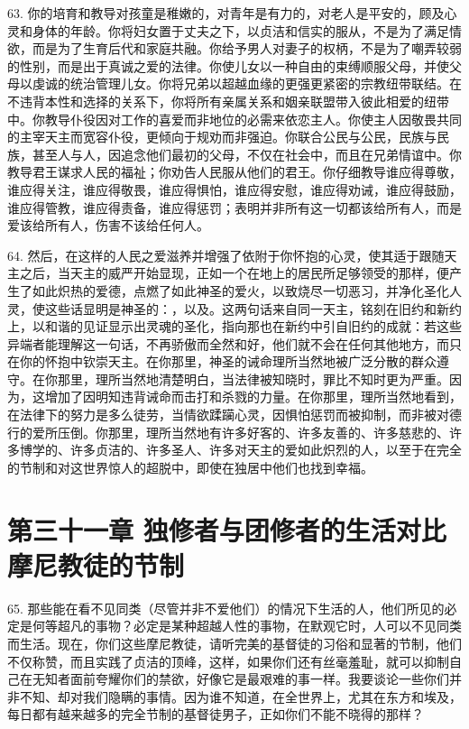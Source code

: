 63. 你的培育和教导对孩童是稚嫩的，对青年是有力的，对老人是平安的，顾及心灵和身体的年龄。你将妇女置于丈夫之下，以贞洁和信实的服从，不是为了满足情欲，而是为了生育后代和家庭共融。你给予男人对妻子的权柄，不是为了嘲弄较弱的性别，而是出于真诚之爱的法律。你使儿女以一种自由的束缚顺服父母，并使父母以虔诚的统治管理儿女。你将兄弟以超越血缘的更强更紧密的宗教纽带联结。在不违背本性和选择的关系下，你将所有亲属关系和姻亲联盟带入彼此相爱的纽带中。你教导仆役因对工作的喜爱而非地位的必需来依恋主人。你使主人因敬畏共同的主宰天主而宽容仆役，更倾向于规劝而非强迫。你联合公民与公民，民族与民族，甚至人与人，因追念他们最初的父母，不仅在社会中，而且在兄弟情谊中。你教导君王谋求人民的福祉；你劝告人民服从他们的君王。你仔细教导谁应得尊敬，谁应得关注，谁应得敬畏，谁应得惧怕，谁应得安慰，谁应得劝诫，谁应得鼓励，谁应得管教，谁应得责备，谁应得惩罚；表明并非所有这一切都该给所有人，而是爱该给所有人，伤害不该给任何人。\par

64. 然后，在这样的人民之爱滋养并增强了依附于你怀抱的心灵，使其适于跟随天主之后，当天主的威严开始显现，正如一个在地上的居民所足够领受的那样，便产生了如此炽热的爱德，点燃了如此神圣的爱火，以致烧尽一切恶习，并净化圣化人灵，使这些话显明是神圣的：，以及。这两句话来自同一天主，铭刻在旧约和新约上，以和谐的见证显示出灵魂的圣化，指向那也在新约中引自旧约的成就：若这些异端者能理解这一句话，不再骄傲而全然和好，他们就不会在任何其他地方，而只在你的怀抱中钦崇天主。在你那里，神圣的诫命理所当然地被广泛分散的群众遵守。在你那里，理所当然地清楚明白，当法律被知晓时，罪比不知时更为严重。因为，这增加了因明知违背诫命而击打和杀戮的力量。在你那里，理所当然地看到，在法律下的努力是多么徒劳，当情欲蹂躏心灵，因惧怕惩罚而被抑制，而非被对德行的爱所压倒。你那里，理所当然地有许多好客的、许多友善的、许多慈悲的、许多博学的、许多贞洁的、许多圣人、许多对天主的爱如此炽烈的人，以至于在完全的节制和对这世界惊人的超脱中，即使在独居中他们也找到幸福。\par


\section{第三十一章 独修者与团修者的生活对比摩尼教徒的节制}

65. 那些能在看不见同类（尽管并非不爱他们）的情况下生活的人，他们所见的必定是何等超凡的事物？必定是某种超越人性的事物，在默观它时，人可以不见同类而生活。现在，你们这些摩尼教徒，请听完美的基督徒的习俗和显著的节制，他们不仅称赞，而且实践了贞洁的顶峰，这样，如果你们还有丝毫羞耻，就可以抑制自己在无知者面前夸耀你们的禁欲，好像它是最艰难的事一样。我要谈论一些你们并非不知、却对我们隐瞒的事情。因为谁不知道，在全世界上，尤其在东方和埃及，每日都有越来越多的完全节制的基督徒男子，正如你们不能不晓得的那样？\par

